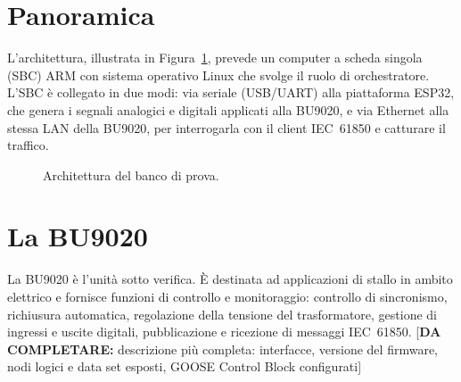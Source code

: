 \documentclass[11pt,a4paper,italian,oneside,openany]{book}
\newcommand{\daf}[1]{{\color{red}[\textbf{DA COMPLETARE:} #1]}}
\begin{document}
\section{Panoramica}
L'architettura, illustrata in Figura~\ref{fig:architettura}, prevede un computer a scheda singola (SBC) ARM con sistema operativo Linux che svolge il ruolo di orchestratore. L'SBC è collegato in due modi: via seriale (USB/UART) alla piattaforma ESP32, che genera i segnali analogici e digitali applicati alla BU9020, e via Ethernet alla stessa LAN della BU9020, per interrogarla con il client IEC~61850 e catturare il traffico.

\begin{figure}[htbp]
\centering
{}
\caption{Architettura del banco di prova.}
\label{fig:architettura}
\end{figure}

\section{La BU9020}
La BU9020 è l'unità sotto verifica. È destinata ad applicazioni di stallo in ambito elettrico e fornisce funzioni di controllo e monitoraggio: controllo di sincronismo, richiusura automatica, regolazione della tensione del trasformatore, gestione di ingressi e uscite digitali, pubblicazione e ricezione di messaggi IEC~61850. \daf{descrizione più completa: interfacce, versione del firmware, nodi logici e data set esposti, GOOSE Control Block configurati}
\end{document}
